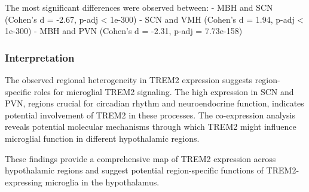 \documentclass[
  letterpaper,
  DIV=11,
  numbers=noendperiod]{scrartcl}
\begin{document}
The most significant differences were observed between: - MBH and SCN
(Cohen's d = -2.67, p-adj \textless{} 1e-300) - SCN and VMH (Cohen's d =
1.94, p-adj \textless{} 1e-300) - MBH and PVN (Cohen's d = -2.31, p-adj
= 7.73e-158)

\subsubsection{Interpretation}\label{interpretation}

The observed regional heterogeneity in TREM2 expression suggests
region-specific roles for microglial TREM2 signaling. The high
expression in SCN and PVN, regions crucial for circadian rhythm and
neuroendocrine function, indicates potential involvement of TREM2 in
these processes. The co-expression analysis reveals potential molecular
mechanisms through which TREM2 might influence microglial function in
different hypothalamic regions.

These findings provide a comprehensive map of TREM2 expression across
hypothalamic regions and suggest potential region-specific functions of
TREM2-expressing microglia in the hypothalamus.
\end{document}
